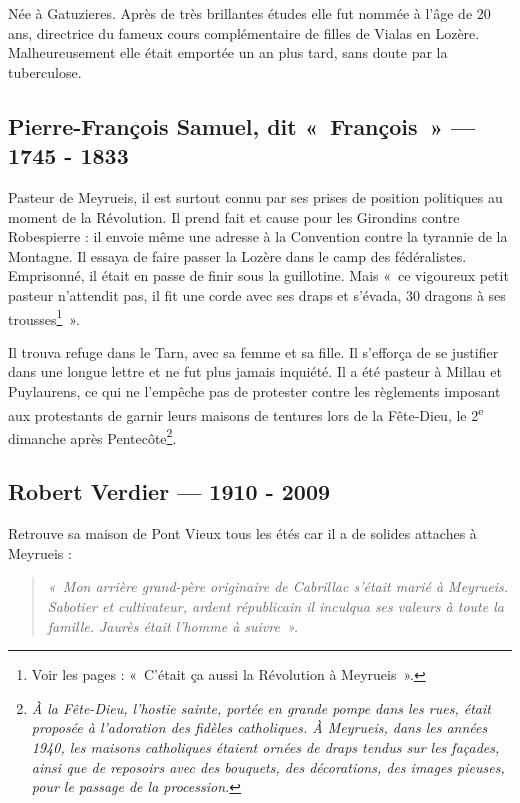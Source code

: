 Née à Gatuzieres. Après de très brillantes études elle fut nommée à l’âge de 20
ans, directrice du fameux cours complémentaire de filles de Vialas en Lozère.
Malheureusement elle était emportée un an plus tard, sans doute par la tuberculose.

\subsection{Pierre-François Samuel, dit «~François~» --- 1745 - 1833}

Pasteur de Meyrueis, il est surtout connu par ses prises de position politiques au
moment de la Révolution. Il prend fait et cause pour les Girondins contre
Robespierre : il envoie même une adresse à la Convention contre la tyrannie de la
Montagne. Il essaya de faire passer la Lozère dans le camp des fédéralistes.
Emprisonné, il était en passe de finir sous la guillotine. Mais «~ce vigoureux petit
pasteur n’attendit pas, il fit une corde avec ses draps et s’évada, 30 dragons à ses
trousses\footnote{Voir les pages : «~C’était ça aussi la Révolution à Meyrueis~».}~».



Il trouva refuge dans le Tarn, avec sa femme et sa fille. Il s’efforça de se justifier
dans une longue lettre et ne fut plus jamais inquiété. Il a été pasteur à Millau et
Puylaurens, ce qui ne l’empêche pas de protester contre les règlements imposant
aux protestants de garnir leurs maisons de tentures lors de la Fête-Dieu, le 2\textsuperscript{e}
dimanche après Pentecôte\footnote{\emph{À la Fête-Dieu, l’hostie sainte, portée en grande pompe dans les rues, était proposée à l’adoration des fidèles catholiques. À Meyrueis, dans les années 1940, les maisons catholiques étaient ornées de draps tendus sur les façades, ainsi que de reposoirs avec des bouquets, des décorations, des images pieuses, pour le passage de la procession.}}.

\subsection{Robert Verdier --- 1910 - 2009}

Retrouve sa maison de Pont Vieux tous les étés car il a de solides attaches à
Meyrueis :

\begin{quote}
\emph{«~Mon arrière grand-père originaire de Cabrillac s’était marié à Meyrueis. Sabotier
et cultivateur, ardent républicain il inculqua ses valeurs à toute la famille. Jaurès
était l’homme à suivre~».}
\end{quote}

